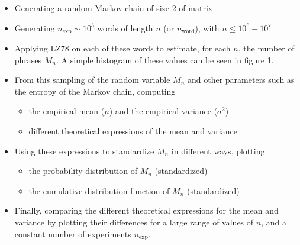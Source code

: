\begin{itemize}

	\item Generating a random Markov chain of size 2 of matrix
 \item
 Generating $n_{\text{exp}} \sim 10^3$ words of length $n $ (or $n_{\text{word}}$), with $n \leq 10^6 - 10^7$
 
 \item Applying LZ78 on each of these words to estimate, for each $n$,
 the number of phrases $M_n$. A simple histogram of these values
 can be seen in figure 1.
 
 \item From this sampling of the random variable $M_n$ and other parameters such as the entropy of the Markov chain, computing
 
 	\begin{itemize}
 		\item the empirical mean ($\mu$) and the empirical variance ($\sigma^2$)
 		\item different theoretical expressions of the mean and variance
 	\end{itemize}
 	
 \item Using these expressions to standardize $M_n$ in different ways, plotting
 
 	\begin{itemize}
 		\item the probability distribution of $M_n$ (standardized)
 			  
 		\item the cumulative distribution function of $M_n$ (standardized)
 	\end{itemize}
 
 \item Finally, comparing the different theoretical expressions for the mean and 
 variance by plotting their differences for a large range of values of $n$, and
 a constant number of experiments $n_{\text{exp}}$.
\end{itemize}
 
 
